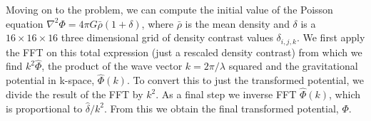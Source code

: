 Moving on to the problem, we can compute the initial value of the Poisson equation $\nabla^2 \Phi = 4\pi G \bar{\rho} (1 + \delta)$, where $\bar{\rho}$ is the mean density and $\delta$ is a $16 \times 16 \times 16$ three dimensional grid of density contrast values $\delta_{i,j,k}$. We first apply the FFT on this total expression (just a rescaled density contrast) from which we find $k^2 \hat{\Phi}$, the product of the wave vector $k = 2\pi/\lambda$ squared and the gravitational potential in k-space, $\hat{\Phi}(k)$. To convert this to just the transformed potential, we divide the result of the FFT by $k^2$. As a final step we inverse FFT $\hat{\Phi}(k)$, which is proportional to $\hat{\delta}/k^2$. From this we obtain the final transformed potential, $\Phi$.\\


















